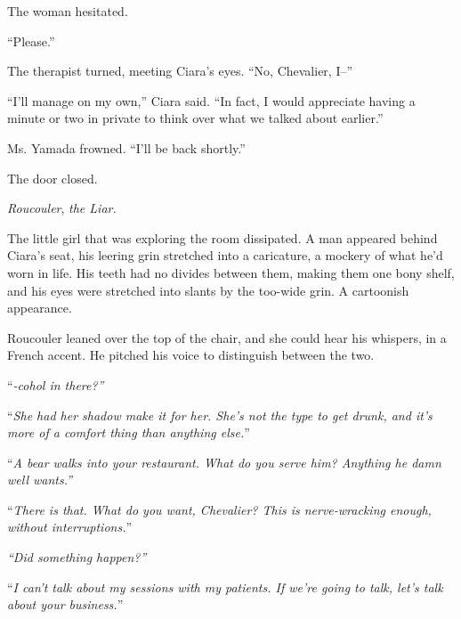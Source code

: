 The woman hesitated.



``Please.''



The therapist turned, meeting Ciara's eyes.  ``No, Chevalier, I--''



``I'll manage on my own,'' Ciara said.  ``In fact, I would appreciate having a minute or two in private to think over what we talked about earlier.''



Ms. Yamada frowned.  ``I'll be back shortly.''



The door closed.



\emph{Roucouler}, \emph{the Liar.}



The little girl that was exploring the room dissipated.  A man appeared behind Ciara's seat, his leering grin stretched into a caricature, a mockery of what he'd worn in life.  His teeth had no divides between them, making them one bony shelf, and his eyes were stretched into slants by the too-wide grin.  A cartoonish appearance.



Roucouler leaned over the top of the chair, and she could hear his whispers, in a French accent.  He pitched his voice to distinguish between the two.



``\emph{-cohol in there?''}



``\emph{She had her shadow make it for her.  She's not the type to get drunk, and it's more of a comfort thing than anything else.}''



``\emph{A bear walks into your restaurant.  What do you serve him?  Anything he damn well wants.''}



``\emph{There is that.  What do you want, Chevalier?  This is nerve-wracking enough, without interruptions.}''



\emph{``Did something happen?''}



``\emph{I can't talk about my sessions with my patients.  If we're going to talk, let's talk about your business.}''



